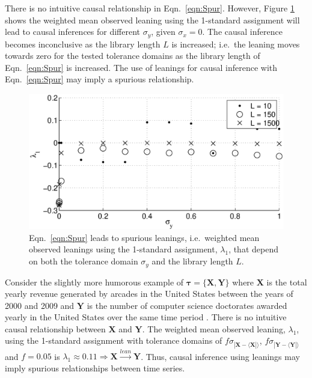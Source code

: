 \documentclass[a4paper,11pt,twocolumn]{article}
\begin{document}
There is no intuitive causal relationship in Eqn.\ \ref{eqn:Spur}.  However, Figure \ref{fig:nocause} shows the weighted mean observed leaning using the 1-standard assignment will lead to causal inferences for different $\sigma_y$, given $\sigma_x = 0$.  The causal inference becomes inconclusive as the library length $L$ is increased; i.e.\ the leaning moves towards zero for the tested tolerance domains as the library length of Eqn.\ \ref{eqn:Spur} is increased.  The use of leanings for causal inference with Eqn.\ \ref{eqn:Spur} may imply a spurious relationship. 
\begin{figure}[ht]
\includegraphics[scale=0.40]{NoCauseplot.eps}
\caption{Eqn.\ \ref{eqn:Spur} leads to spurious leanings, i.e.\ weighted mean observed leanings using the 1-standard assignment, $\lambda_1$, that depend on both the tolerance domain $\sigma_y$ and the library length $L$.}
\label{fig:nocause}
\end{figure}

Consider the slightly more humorous example of $\mathbf{\tau} =\{\mathbf{X},\mathbf{Y}\}$ where $\mathbf{X}$ is the total yearly revenue generated by arcades in the United States between the years of 2000 and 2009 and $\mathbf{Y}$ is the number of computer science doctorates awarded yearly in the United States over the same time period \cite{http://www.tylervigen.com/view_correlation?id=97}.  There is no intuitive causal relationship between $\mathbf{X}$ and $\mathbf{Y}$.  The weighted mean observed leaning, $\lambda_1$, using the 1-standard assignment with tolerance domains of  $f\sigma_{|\mathbf{X}-\langle\mathbf{X}|\rangle}$, $f\sigma_{|\mathbf{Y}-\langle\mathbf{Y}|\rangle}$ and $f=0.05$ is $\lambda_1 \approx 0.11\Rightarrow\mathbf{X}\xrightarrow{lean}\mathbf{Y}$.  Thus, causal inference using leanings may imply spurious relationships between time series.
\end{document}
